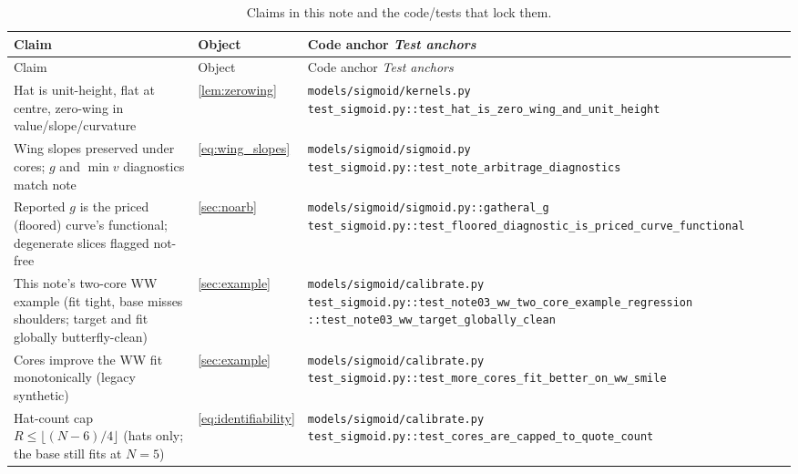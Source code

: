 \documentclass[11pt]{article}
\begin{document}
\begingroup
\small
\setlength{\tabcolsep}{4pt}
\renewcommand{\arraystretch}{1.15}
\begin{longtable}{@{}p{}p{}p{}@{}}
\caption{Claims in this note and the code/tests that lock them.}\\
\toprule Claim & Object & Code anchor \newline \emph{Test anchors}\\ \midrule
\endfirsthead
\toprule Claim & Object & Code anchor \newline \emph{Test anchors}\\ \midrule
\endhead
Hat is unit-height, flat at centre, zero-wing in value/slope/curvature &
\cref{lem:zerowing} &
\nolinkurl{models/sigmoid/kernels.py}\newline
\nolinkurl{test_sigmoid.py::test_hat_is_zero_wing_and_unit_height}\\
\addlinespace
Wing slopes preserved under cores; $g$ and $\min v$ diagnostics match note &
\eqref{eq:wing_slopes} &
\nolinkurl{models/sigmoid/sigmoid.py}\newline
\nolinkurl{test_sigmoid.py::test_note_arbitrage_diagnostics}\\
\addlinespace
Reported $g$ is the priced (floored) curve's functional; degenerate slices
flagged not-free &
\cref{sec:noarb} &
\nolinkurl{models/sigmoid/sigmoid.py::gatheral_g}\newline
\nolinkurl{test_sigmoid.py::test_floored_diagnostic_is_priced_curve_functional}\\
\addlinespace
This note's two-core WW example (fit tight, base misses shoulders; target
and fit globally butterfly-clean) &
\cref{sec:example} &
\nolinkurl{models/sigmoid/calibrate.py}\newline
\nolinkurl{test_sigmoid.py::test_note03_ww_two_core_example_regression}\newline
\nolinkurl{::test_note03_ww_target_globally_clean}\\
\addlinespace
Cores improve the WW fit monotonically (legacy synthetic) &
\cref{sec:example} &
\nolinkurl{models/sigmoid/calibrate.py}\newline
\nolinkurl{test_sigmoid.py::test_more_cores_fit_better_on_ww_smile}\\
\addlinespace
Hat-count cap $R\le\lfloor(N-6)/4\rfloor$ (hats only; the base still fits at
$N=5$) &
\eqref{eq:identifiability} &
\nolinkurl{models/sigmoid/calibrate.py}\newline
\nolinkurl{test_sigmoid.py::test_cores_are_capped_to_quote_count}\\

\end{longtable}
\end{document}
